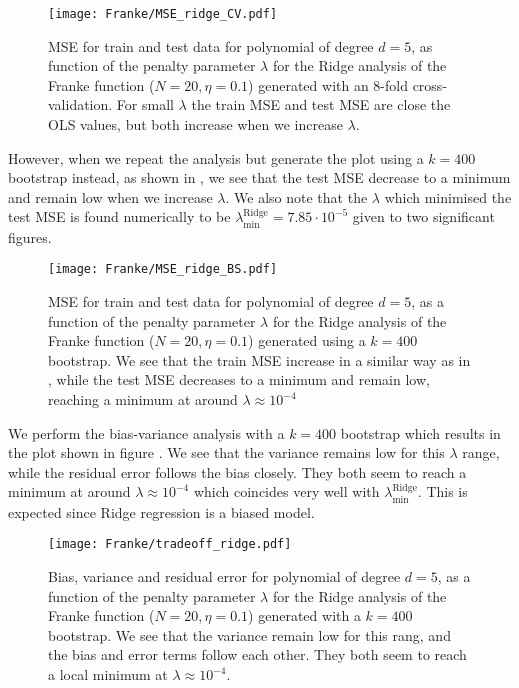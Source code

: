         \begin{figure}
            \texttt{[image: Franke/MSE\_ridge\_CV.pdf]}
            \caption{MSE for train and test data for polynomial of degree $d=5$, as function of the penalty parameter $\lambda$ for the Ridge analysis of the Franke function ($N=20, \eta=0.1$) generated with an 8-fold cross-validation. For small $\lambda$ the train MSE and test MSE are close the OLS values, but both increase when we increase $\lambda$.}
            \label{fig:cross-validation_ridge}
        \end{figure}

        However, when we repeat the analysis but generate the plot using a $k=400$ bootstrap instead, as shown in , we see that the test MSE decrease to a minimum and remain low when we increase $\lambda$. We also note that the $\lambda$ which minimised the test MSE is found numerically to be $\lambda_\mathrm{min}^\mathrm{Ridge} = 7.85\cdot10^{-5}$ given to two significant figures. 


        \begin{figure}
            \texttt{[image: Franke/MSE\_ridge\_BS.pdf]}
            \caption{MSE for train and test data for polynomial of degree $d=5$, as a function of the penalty parameter $\lambda$ for the Ridge analysis of the Franke function ($N=20, \eta=0.1$) generated using a $k=400$ bootstrap. We see that the train MSE increase in a similar way as in , while the test MSE decreases to a minimum and remain low, reaching a minimum at around $\lambda\approx 10^{-4}$ }
            \label{fig:bootstrapping_ridge}
        \end{figure}

        We perform the bias-variance analysis with a $k=400$ bootstrap which results in the plot shown in figure . We see that the variance remains low for this $\lambda$ range, while the residual error follows the bias closely. They both seem to reach a minimum at around $\lambda\approx 10^{-4}$ which coincides very well with $\lambda^\mathrm{Ridge}_\mathrm{min}$. This is expected since Ridge regression is a biased model. 

        \begin{figure}
            \texttt{[image: Franke/tradeoff\_ridge.pdf]}
            \caption{Bias, variance and residual error for polynomial of degree $d=5$, as a function of the penalty parameter $\lambda$ for the Ridge analysis of the Franke function ($N=20, \eta=0.1$) generated with a $k=400$ bootstrap. We see that the variance remain low for this rang, and the bias and error terms follow each other. They both seem to reach a local minimum at $\lambda\approx 10^{-4}$.}
            \label{fig:bias_variance_ridge}
        \end{figure}

